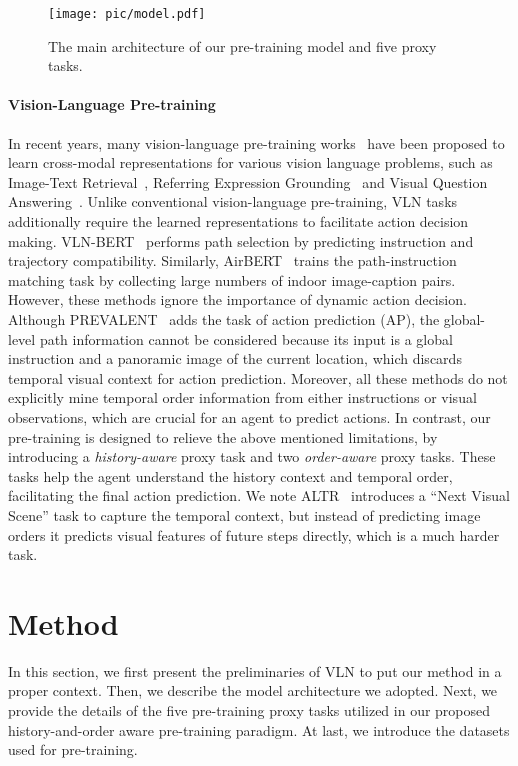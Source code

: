 \documentclass[10pt,twocolumn,letterpaper]{article}
\begin{document}
\begin{figure*}[!t]
\centering
	\texttt{[image: pic/model.pdf]}
	\vspace{-8mm}
	\caption{
	The main architecture of our pre-training model and five proxy tasks.
}
	\vspace{-6mm}
	\label{fig:architecture}
\end{figure*}

\vspace{-10pt}
\paragraph{Vision-Language Pre-training}
In recent years, many vision-language pre-training works~\cite{vilbert,lxmert,uniter,oscar} have been proposed to learn cross-modal representations for various vision language problems, such as Image-Text Retrieval~\cite{itr}, Referring Expression Grounding~\cite{reg} and Visual Question Answering~\cite{vqa}. 
Unlike conventional vision-language pre-training, VLN tasks additionally require the learned representations to facilitate action decision making. 
VLN-BERT~\cite{bertvln} performs path selection by predicting instruction and trajectory compatibility.
Similarly, AirBERT~\cite{airbert} trains the path-instruction matching task by collecting large numbers of indoor image-caption pairs. 
However, these methods ignore the importance of dynamic action decision. 
Although PREVALENT~\cite{prevalent} adds the task of action prediction (AP), the global-level path information cannot be considered because its input is a global instruction and a panoramic image of the current location,
which discards temporal visual context for action prediction.
{Moreover, all these methods do not explicitly mine temporal order information from either instructions or visual observations, which are crucial for an agent to predict actions.}
{In contrast, our pre-training is designed to relieve the above mentioned limitations, by introducing a \textit{history-aware} proxy task and two \textit{order-aware} proxy tasks. These tasks help the agent understand the history context and temporal order, facilitating the final action prediction.} We note ALTR~\cite{altr} introduces a ``Next Visual Scene'' task to capture the temporal context, but instead of predicting image orders it predicts visual features of future steps directly, which is a much harder task.


 \section{Method}
\label{sec:HOP model}
\vspace{-3pt}
In this section, we first present the preliminaries of VLN to put our method in a proper context. Then, we describe the model architecture we adopted. Next, we provide the details of the five pre-training proxy tasks utilized in our proposed history-and-order aware pre-training paradigm. At last, we introduce the datasets used for pre-training.
\end{document}
